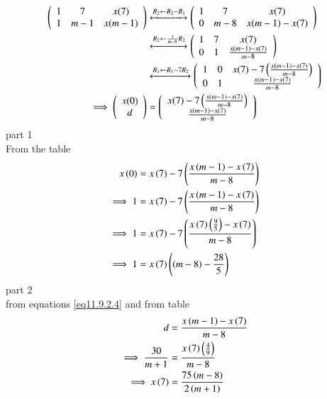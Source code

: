 \documentclass[journal,12pt,onecolumn]{IEEEtran}
\theoremstyle{remark}
\begin{document}
\begin{align}
\left(
\begin{array}{ccc}
1 & 7 & x(7) \\
1 & m-1 & x(m-1)
\end{array}
\right)
&\xleftrightarrow[]{R_2 \leftarrow R_2-R_1}
\left(
\begin{array}{ccc}
1 & 7 & x(7) \\
0 & m-8 & x(m-1)-x(7)
\end{array}
\right)
\\
&\xleftrightarrow[]{R_2 \leftarrow \frac{1}{m-8}R_2}
\left(
\begin{array}{ccc}
1 & 7 & x(7) \\
0 & 1 & \frac{x(m-1)-x(7)}{m-8}
\end{array}
\right)
\\
&\xleftrightarrow[]{R_1 \leftarrow R_1-7R_2}
\left(
\begin{array}{ccc}
1 & 0 & x(7)-7\left(\frac{x(m-1)-x(7)}{m-8}\right) \\
0 & 1 & \frac{x(m-1)-x(7)}{m-8}
\end{array}
\right)
\\
\implies \left(
\begin{array}{c}
x(0) \\
d
\end{array}
\right)
&=
\left(
\begin{array}{c}
x(7)-7\left(\frac{x(m-1)-x(7)}{m-8}\right) \\
\frac{x(m-1)-x(7)}{m-8}
\end{array}
\right)
\end{align}
part 1\\
From the table \\
\begin{align}
    x\left(0\right)&=x\left(7\right)-7\left(\frac{x\left(m-1\right)-x\left(7\right)}{m-8}\right)\\
    \implies1&=x\left(7\right)-7\left(\frac{x\left(m-1\right)-x\left(7\right)}{m-8}\right)\\
    \implies1&=x\left(7\right)-7\left(\frac{x\left(7\right)\left(\frac{9}{5}\right)-x\left(7\right)}{m-8}\right)\\
    \implies1&=x\left(7\right)\left(\left(m-8\right)-\frac{28}{5}\right) \label{eq11.9.2.14}
\end{align}
part 2\\
from equations \eqref{eq11.9.2.4} and from table\\
 \begin{align}
    d&=\frac{x\left(m-1\right)-x\left(7\right)}{m-8}\\
    \implies\frac{30}{m+1}&=\frac{x\left(7\right)\left(\frac{4}{9}\right)}{m-8}\\ \label{eq11.9.2.17}
    \implies x\left(7\right)&=\frac{75\left(m-8\right)}{2\left(m+1\right)}
 \end{align}
\end{document}
